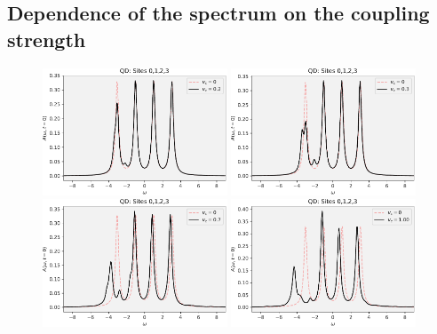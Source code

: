 \subsection{Dependence of the spectrum on the coupling strength}

\begin{figure}[!hbt]
    \centering
    \includegraphics[width=0.49\textwidth]{graph/spectrum_vc_sweep/QD_All_020.pdf}
    \includegraphics[width=0.49\textwidth]{graph/spectrum_vc_sweep/QD_All_030.pdf}
    \includegraphics[width=0.49\textwidth]{graph/spectrum_vc_sweep/QD_All_070.pdf}
    \includegraphics[width=0.49\textwidth]{graph/spectrum_vc_sweep/QD_All_100.pdf}
    \caption{}
    \label{fig:spectrum_vc_sweep}
\end{figure}